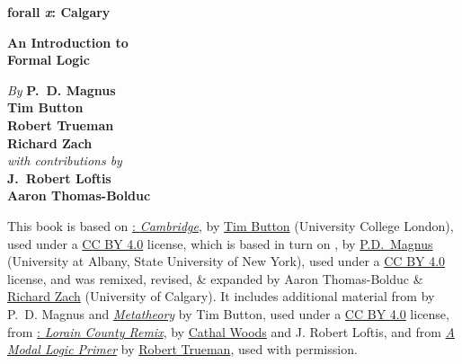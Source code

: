 
\ifHTMLtarget\else

\pagestyle{empty}

\vspace*{80pt}

\begin{raggedleft}
\fontsize{30pt}{24pt}\sffamily
\selectfont
  \textbf{forall 
  {\fontsize{37pt}{24pt}\selectfont\rmfamily\textit{x}}: 
  Calgary}

\medskip\fontsize{18pt}{20pt}\selectfont

\textbf{An Introduction to\\ Formal Logic}

\vfill
\fontsize{12pt}{16pt}\selectfont \textit{By } \textbf{P.~D. Magnus}\\
\textbf{Tim Button}\\
\textbf{Robert Trueman}\\
\textbf{Richard Zach}\\
\textit{with contributions by}\\
\textbf{J.~Robert Loftis}\\
\textbf{Aaron Thomas-Bolduc}\\ 

\vfill
\textbf{\forallxversion}\par
\end{raggedleft}

\newpage

\noindent\small%
\fi
This book is based on
\href{https://www.homepages.ucl.ac.uk/~uctytbu/OERs.html}{\forallx:
\textit{Cambridge}}, by 
\href{https://www.homepages.ucl.ac.uk/~uctytbu/}{Tim Button} (University College London), 
used under a \href{https://creativecommons.org/licenses/by/4.0/}{CC BY
4.0} license, which is based in turn
on \href{https://www.fecundity.com/logic/}{\forallx}, by
\href{https://www.fecundity.com/job/}{P.D.\ Magnus} 
(University at Albany, State University of New York),
used under a \href{https://creativecommons.org/licenses/by/4.0/}{CC BY
4.0} license, 
and was remixed, revised, \& expanded by Aaron
Thomas-Bolduc \& \href{https://richardzach.org/}{Richard Zach}
(University of Calgary).
It includes additional material from \forallx{} by P.~D. Magnus and
\href{https://www.homepages.ucl.ac.uk/~uctytbu/OERs.html}{\textit{Metatheory}} by Tim Button, 
used under a \href{https://creativecommons.org/licenses/by/4.0/}{CC BY
4.0} license, 
from \href{https://github.com/rob-helpy-chalk/openintroduction}{\forallx: \textit{Lorain
County Remix}},
by \href{https://sites.google.com/site/cathalwoods/}{Cathal Woods} and
J. Robert Loftis, and from \href{http://www.rtrueman.com/uploads/7/0/3/2/70324387/modal_logic_primer.pdf}{\textit{A Modal Logic Primer}} by \href{http://www.rtrueman.com/}{Robert Trueman}, used with permission.


